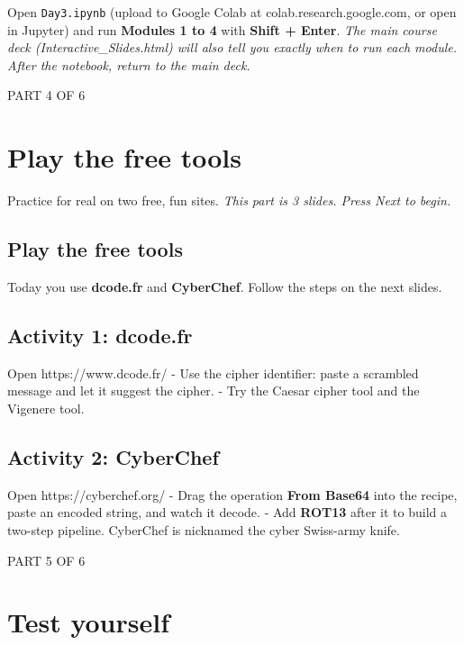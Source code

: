 \documentclass[12pt,openany]{book}
\begin{document}
Open \texttt{Day3.ipynb} (upload to Google Colab at colab.research.google.com, or open in Jupyter) and run \textbf{Modules 1 to 4} with \textbf{Shift + Enter}.
{\small\itshape\color{gray}The main course deck (Interactive\_Slides.html) will also tell you exactly when to run each module. After the notebook, return to the main deck.}

\medskip

\vspace{4pt}\noindent\textsc{PART 4 OF 6}


\section*{Play the free tools}

Practice for real on two free, fun sites.
{\small\itshape\color{gray}This part is 3 slides. Press Next to begin.}

\medskip

\subsection*{Play the free tools}

Today you use \textbf{dcode.fr} and \textbf{CyberChef}. Follow the steps on the next slides.

\medskip

\subsection*{Activity 1: dcode.fr}


Open https://www.dcode.fr/
- Use the cipher identifier: paste a scrambled message and let it suggest the cipher.
- Try the Caesar cipher tool and the Vigenere tool.

\medskip

\subsection*{Activity 2: CyberChef}


Open https://cyberchef.org/
- Drag the operation \textbf{From Base64} into the recipe, paste an encoded string, and watch it decode.
- Add \textbf{ROT13} after it to build a two-step pipeline. CyberChef is nicknamed the cyber Swiss-army knife.

\medskip

\vspace{4pt}\noindent\textsc{PART 5 OF 6}


\section*{Test yourself}
\end{document}
